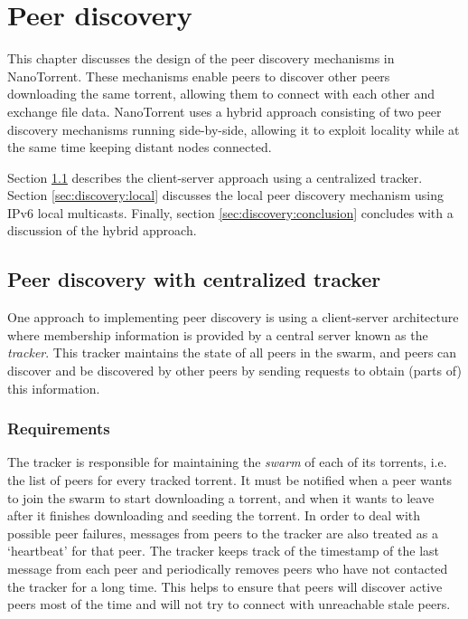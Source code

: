 \chapter{Peer discovery}
\label{cha:discovery}
This chapter discusses the design of the peer discovery mechanisms in NanoTorrent. These mechanisms enable peers to discover other peers downloading the same torrent, allowing them to connect with each other and exchange file data. NanoTorrent uses a hybrid approach consisting of two peer discovery mechanisms running side-by-side, allowing it to exploit locality while at the same time keeping distant nodes connected.

Section \ref{sec:discovery:tracker} describes the client-server approach using a centralized tracker. Section \ref{sec:discovery:local} discusses the local peer discovery mechanism using \gls{IPv6} local multicasts. Finally, section \ref{sec:discovery:conclusion} concludes with a discussion of the hybrid approach.

\section{Peer discovery with centralized tracker}
\label{sec:discovery:tracker}
One approach to implementing peer discovery is using a client-server architecture where membership information is provided by a central server known as the \emph{\gls{tracker}}. This tracker maintains the state of all peers in the \gls{swarm}, and peers can discover and be discovered by other peers by sending requests to obtain (parts of) this information.

\subsection{Requirements}
The \gls{tracker} is responsible for maintaining the \emph{\gls{swarm}} of each of its torrents, i.e. the list of \glspl{peer} for every tracked torrent. It must be notified when a peer wants to join the swarm to start downloading a torrent, and when it wants to leave after it finishes downloading and seeding the torrent. In order to deal with possible peer failures, messages from peers to the tracker are also treated as a `heartbeat' for that peer. The tracker keeps track of the timestamp of the last message from each peer and periodically removes peers who have not contacted the tracker for a long time. This helps to ensure that peers will discover active peers most of the time and will not try to connect with unreachable stale peers.

